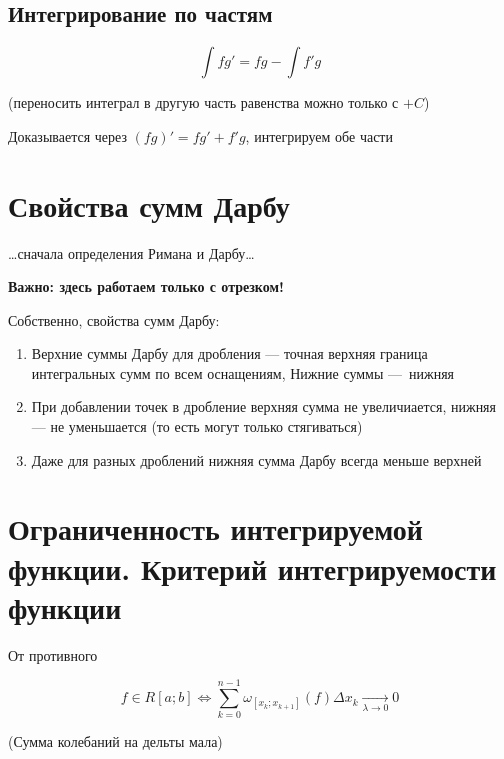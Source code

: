 \documentclass[12pt, a4paper]{article}
\begin{document}
    
    \subsection{Интегрирование по частям}

    \begin{equation}
        \int f g' = f g - \int f' g
    \end{equation}

    (переносить интеграл в другую часть равенства можно только с $+ C$)

    Доказывается через $(fg)' = fg' + f'g$, интегрируем обе части

\section{Свойства сумм Дарбу}

    …сначала определения Римана и Дарбу…

    \textbf{Важно: здесь работаем только с отрезком!}



    Собственно, свойства сумм Дарбу:
    \begin{enumerate}
        \item Верхние суммы Дарбу для дробления — точная верхняя граница интегральных сумм по всем оснащениям, Нижние суммы — нижняя
        \item При добавлении точек в дробление верхняя сумма не увеличиается, нижняя — не уменьшается (то есть могут только стягиваться)
        \item Даже для разных дроблений нижняя сумма Дарбу всегда меньше верхней
    \end{enumerate}

\section{Ограниченность интегрируемой функции. Критерий интегрируемости функции}

\begin{theorem}
    
    От противного
\end{theorem} 


\begin{theorem}
    
    \begin{equation}
        f \in R [a; b] \Leftrightarrow \sum_{k = 0}^{n - 1} \omega_{[x_k; x_{k + 1}]}(f) \Delta x_k \underset{\lambda \to 0}{\longrightarrow} 0
    \end{equation}

    (Сумма колебаний на дельты мала)

\end{theorem}
\end{document}

